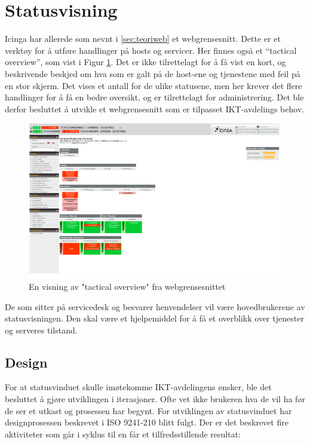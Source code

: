 \section{Statusvisning}

Icinga har allerede som nevnt i \ref{sec:teoriweb} et webgrensesnitt. Dette er et verktøy for å utføre handlinger på hosts og servicer. Her finnes også et “tactical overview”, som vist i Figur \ref{icingawebgui}. Det er ikke tilrettelagt for å få vist en kort, og beskrivende beskjed om hva som er galt på de host-ene og tjenestene med feil på en stor skjerm. Det vises et antall for de ulike statusene, men her krever det flere handlinger for å få en bedre oversikt, og er tilrettelagt for administrering. Det ble derfor besluttet å utvikle et webgrensesnitt som er tilpasset IKT-avdelings behov.

\begin{figure}[H]
    \centering
    \includegraphics[scale=0.6]{img/icinga_tactical}
    \caption{En visning av "tactical overview" fra webgrensesnittet}
    \label{icingawebgui}
\end{figure}


De som sitter på servicedesk og besvarer henvendelser vil være hovedbrukerene av statusvisningen. Den skal være et hjelpemiddel for å få et overblikk over tjenester og serveres tilstand.

\subsection{Design}

For at statusvinduet skulle imøtekomme IKT-avdelingens ønsker, ble det besluttet å gjøre utviklingen i iterasjoner. Ofte vet ikke brukeren hva de vil ha før de ser et utkast og prosessen har begynt. For utviklingen av statusvinduet har designprosessen beskrevet i ISO 9241-210 blitt fulgt. Der er det beskrevet fire aktiviteter som går i syklus til en får et tilfredsstillende resultat:

